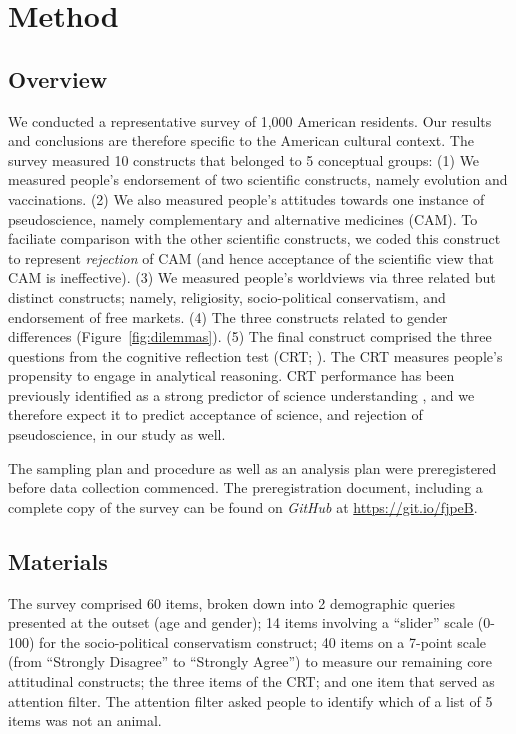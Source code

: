 \documentclass[fignum,man]{apa}\usepackage[]{graphicx}\usepackage[]{color}
\begin{document}
\section{Method}

\subsection{Overview}
We conducted a representative survey of 1,000 American residents.
Our results and conclusions are therefore specific to the American cultural
context.
The survey 
measured 10 constructs that belonged
to 5 conceptual groups:
(1) We measured people's endorsement of
two scientific constructs, namely evolution and vaccinations.
(2) We also measured people's attitudes towards
one instance of pseudoscience, namely
complementary and alternative medicines (CAM). 
To faciliate comparison with the other scientific constructs,
we coded this construct to represent \textit{rejection }of CAM
(and hence acceptance of the scientific view that
CAM is ineffective).
(3) We measured people's worldviews via three
related but distinct constructs; namely,
religiosity, socio-political conservatism, and endorsement of free markets.
(4) The three constructs related to gender differences (Figure~\ref{fig:dilemmas}).
(5) The final construct comprised the
three questions from the cognitive reflection test 
(CRT; ).
The CRT measures people's propensity to engage in analytical reasoning.
CRT performance 
has been previously identified as a 
strong predictor of science understanding , and we therefore
expect it to predict acceptance of science, and rejection of pseudoscience, in our
study as well.

The sampling plan and procedure as well as an analysis
plan were preregistered before data collection
commenced. The preregistration document, including a complete
copy of the survey can be found on \textit{GitHub} at 
\url{https://git.io/fjpeB}.


\subsection{Materials}
The survey comprised 60 items, broken
down into 2 demographic queries presented at the outset (age and gender); 
14 items involving a ``slider'' scale (0-100) for the socio-political conservatism
construct; 
40 items on a 7-point scale (from ``Strongly Disagree'' to ``Strongly Agree'') 
to measure 
our remaining core attitudinal constructs;
the three items of the CRT;
and one item that served as attention filter. 
The attention filter asked people to identify which of a list of 5 items
was not an animal.
\end{document}
